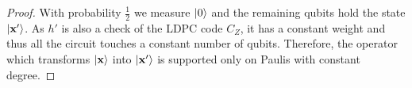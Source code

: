 \documentclass[manuscript,screen,review]{acmart}
\begin{document}
\begin{proof}
With probability $\frac{1}{2}$ we measure $\ket{0}$ and the remaining qubits hold the state $\ket{\mathbf{x'}}$. As $h'$ is also a check of the LDPC code $C_Z$, it has a constant weight and thus all the circuit touches a constant number of qubits. Therefore, the operator which transforms $\ket{\mathbf{x}}$ into $\ket{\mathbf{x'}}$ is supported only on Paulis with constant degree.     
\end{proof}  

% 

\printbibliography
\end{document}

